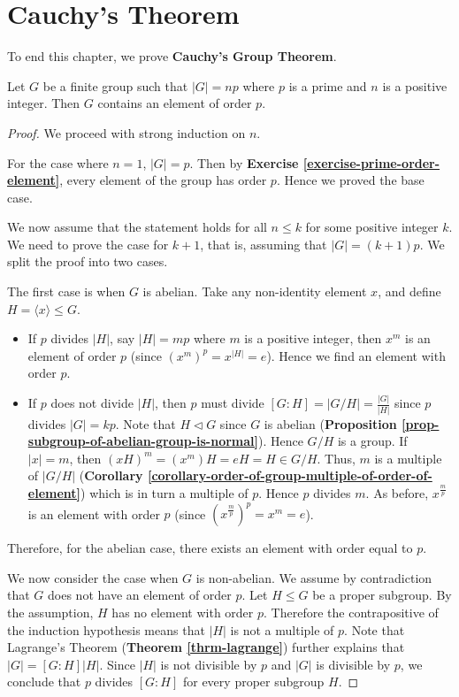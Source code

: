 \newpage

\section{Cauchy's Theorem}
To end this chapter, we prove \textbf{Cauchy's Group Theorem}.
\begin{theorem}[Cauchy]\label{thrm-cauchy}
    Let $G$ be a finite group such that $|G| = np$ where $p$ is a prime and $n$ is a positive integer. Then $G$ contains an element of order $p$.
\end{theorem}
\begin{proof}
    We proceed with strong induction on $n$.

    For the case where $n = 1$, $|G| = p$. Then by \textbf{Exercise \ref{exercise-prime-order-element}}, every element of the group has order $p$. Hence we proved the base case.

    We now assume that the statement holds for all $n \leq k$ for some positive integer $k$. We need to prove the case for $k+1$, that is, assuming that $|G| = (k+1)p$. We split the proof into two cases.

    The first case is when $G$ is abelian. Take any non-identity element $x$, and define $H = \langle x \rangle \leq G$.
    \begin{itemize}
        \item If $p$ divides $|H|$, say $|H| = mp$ where $m$ is a positive integer, then $x^m$ is an element of order $p$ (since $\left(x^m\right)^p = x^{|H|} = e$). Hence we find an element with order $p$.
        \item If $p$ does not divide $|H|$, then $p$ must divide $[G:H] = |G/H| = \frac{|G|}{|H|}$ since $p$ divides $|G| = kp$. Note that $H \lhd G$ since $G$ is abelian (\textbf{Proposition \ref{prop-subgroup-of-abelian-group-is-normal}}). Hence $G/H$ is a group. If $|x| = m$, then $(xH)^m = (x^m)H = eH = H \in G/H$. Thus, $m$ is a multiple of $|G/H|$ (\textbf{Corollary \ref{corollary-order-of-group-multiple-of-order-of-element}}) which is in turn a multiple of $p$. Hence $p$ divides $m$. As before, $x^{\frac mp}$ is an element with order $p$ (since $\left(x^{\frac mp}\right)^p = x^m = e$).
    \end{itemize}
    Therefore, for the abelian case, there exists an element with order equal to $p$.

    We now consider the case when $G$ is non-abelian. We assume by contradiction that $G$ does not have an element of order $p$. Let $H \leq G$ be a proper subgroup. By the assumption, $H$ has no element with order $p$. Therefore the contrapositive of the induction hypothesis means that $|H|$ is not a multiple of $p$. Note that Lagrange's Theorem (\textbf{Theorem \ref{thrm-lagrange}}) further explains that $|G| = [G:H]|H|$. Since $|H|$ is not divisible by $p$ and $|G|$ is divisible by $p$, we conclude that $p$ divides $[G:H]$ for every proper subgroup $H$.


\end{proof}
